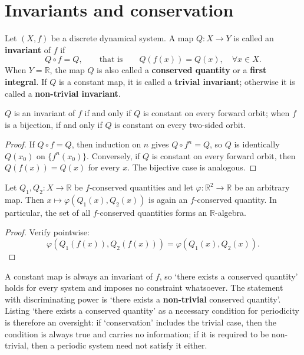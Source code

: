 \section{Invariants and conservation}
\label{sec:invariants_conservation}

\begin{definition}\label{def:invariant}
Let $(X,f)$ be a discrete dynamical system. A map $Q:X\to Y$ is called an \textbf{invariant} of $f$ if
\[
Q\circ f=Q,\qquad\text{that is}\qquad Q(f(x))=Q(x),\quad\forall x\in X.
\]
When $Y=\mathbb{R}$, the map $Q$ is also called a \textbf{conserved quantity} or a \textbf{first integral}. If $Q$ is a constant map, it is called a \textbf{trivial invariant}; otherwise it is called a \textbf{non-trivial invariant}.
\end{definition}

\begin{proposition}\label{prop:invariant_orbit}
$Q$ is an invariant of $f$ if and only if $Q$ is constant on every forward orbit; when $f$ is a bijection, if and only if $Q$ is constant on every two-sided orbit.
\end{proposition}

\begin{proof}
If $Q\circ f=Q$, then induction on $n$ gives $Q\circ f^n=Q$, so $Q$ is identically $Q(x_0)$ on $\{f^n(x_0)\}$. Conversely, if $Q$ is constant on every forward orbit, then $Q(f(x))=Q(x)$ for every $x$. The bijective case is analogous.
\end{proof}

\begin{property}\label{prop:invariant_algebra}
Let $Q_1,Q_2:X\to\mathbb{R}$ be $f$-conserved quantities and let $\varphi:\mathbb{R}^2\to\mathbb{R}$ be an arbitrary map. Then $x\mapsto\varphi(Q_1(x),Q_2(x))$ is again an $f$-conserved quantity. In particular, the set of all $f$-conserved quantities forms an $\mathbb{R}$-algebra.
\end{property}

\begin{proof}
Verify pointwise:
\[
\varphi(Q_1(f(x)),Q_2(f(x)))=\varphi(Q_1(x),Q_2(x)).
\]
\end{proof}

\begin{remark}\label{rem:trivial_invariant}
A constant map is always an invariant of $f$, so `there exists a conserved quantity' holds for every system and imposes no constraint whatsoever. The statement with discriminating power is `there exists a \textbf{non-trivial} conserved quantity'. Listing `there exists a conserved quantity' as a necessary condition for periodicity is therefore an oversight: if `conservation' includes the trivial case, then the condition is always true and carries no information; if it is required to be non-trivial, then a periodic system need not satisfy it either.
\end{remark}

